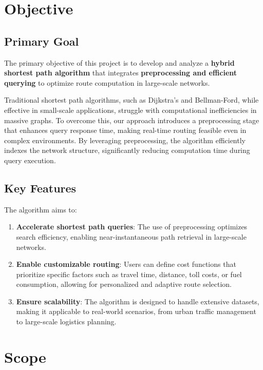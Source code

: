 	
	\section{Objective}
	
	\subsection{Primary Goal}
	The primary objective of this project is to develop and analyze a \textbf{hybrid shortest path algorithm} that integrates \textbf{preprocessing and efficient querying} to optimize route computation in large-scale networks. 
	
	Traditional shortest path algorithms, such as Dijkstra’s and Bellman-Ford, while effective in small-scale applications, struggle with computational inefficiencies in massive graphs. To overcome this, our approach introduces a preprocessing stage that enhances query response time, making real-time routing feasible even in complex environments. By leveraging preprocessing, the algorithm efficiently indexes the network structure, significantly reducing computation time during query execution.
	
	\subsection{Key Features}
	The algorithm aims to:
	\begin{enumerate}
		\item \textbf{Accelerate shortest path queries}: The use of preprocessing optimizes search efficiency, enabling near-instantaneous path retrieval in large-scale networks.
		\item \textbf{Enable customizable routing}: Users can define cost functions that prioritize specific factors such as travel time, distance, toll costs, or fuel consumption, allowing for personalized and adaptive route selection.
		\item \textbf{Ensure scalability}: The algorithm is designed to handle extensive datasets, making it applicable to real-world scenarios, from urban traffic management to large-scale logistics planning.
	\end{enumerate}
	
	\section{Scope}
	
